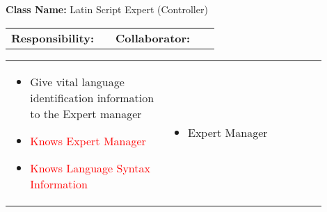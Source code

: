 \begin{cards}[]
    \textbf{Class Name:} Latin Script Expert (Controller)
    \tcbline
    \begin{tabular}{p{0.45\linewidth} | p{0.45\linewidth}}
        \textbf{Responsibility:}& 
        \textbf{Collaborator:}\\
    \end{tabular}
    \tcbline
    \begin{tabular}{p{0.45\linewidth} | p{0.45\linewidth}}
        \begin{itemize}
            \item Give vital language identification information to the Expert manager
            \item \textcolor{red}{Knows Expert Manager}
            \item \textcolor{red}{Knows Language Syntax Information}
        \end{itemize}
        &
        \begin{itemize}
            \item Expert Manager
        \end{itemize}
    \end{tabular}
\end{cards}